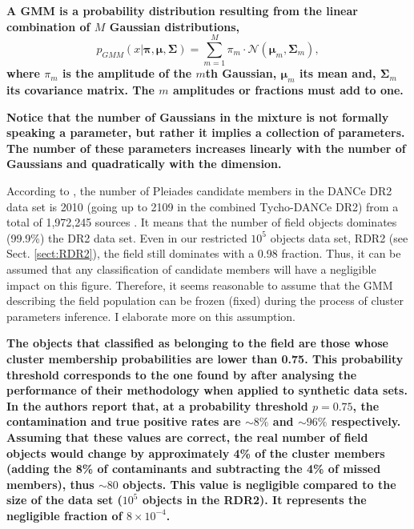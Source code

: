 \textbf{A GMM is a probability distribution resulting from the linear combination of $M$ Gaussian distributions, }
\begin{equation}
p_{GMM}(x|\boldsymbol{\pi},\boldsymbol{\mu},\boldsymbol{\Sigma})=\sum_{m=1}^M \pi_m \cdot \mathcal{N}(\boldsymbol{\mu}_m,\boldsymbol{\Sigma}_m),
\end{equation}
\textbf{where $\pi_m$ is the amplitude of the $m$th Gaussian, $\boldsymbol{\mu}_m$ its mean and, $\boldsymbol{\Sigma}_m$ its covariance matrix. The $m$ amplitudes or fractions must add to one. }

\textbf{Notice that the number of Gaussians in the mixture is not formally speaking a parameter, but rather it implies a collection of parameters. The number of these parameters increases linearly with the number of Gaussians and quadratically with the dimension.} 

According to \citet{Bouy2015}, the number of Pleiades candidate members in the DANCe DR2 data set is 2010 (going up to 2109 in the combined Tycho-DANCe DR2) from a total of 1,972,245 sources . It means that the number of field objects dominates (99.9\%) the DR2 data set. Even in our restricted $10^5$ objects data set, RDR2 (see Sect. \ref{sect:RDR2}), the field still dominates with a 0.98 fraction. Thus, it can be assumed that any classification of candidate members will have a negligible impact on this figure. Therefore, it seems reasonable to assume that the GMM describing the field population can be frozen (fixed) during the process of cluster parameters inference. I elaborate more on this assumption.


\textbf{The objects that \citet{Bouy2015} classified as belonging to the field are those whose cluster membership probabilities are lower than 0.75. This probability threshold corresponds to the one found by \citet{Sarro2014} after analysing the performance of their methodology when applied to synthetic data sets. In \citet{Sarro2014} the authors report that, at a probability threshold $p=0.75$, the contamination and true positive rates are $\sim 8\%$ and $ \sim96\%$ respectively. Assuming that these values are correct, the real number of field objects would change by approximately 4\% of the cluster members (adding the 8\% of contaminants and subtracting the 4\% of missed members), thus $\sim 80$ objects. This value is negligible compared to the size of the data set ($10^5$ objects in the RDR2). It represents the negligible fraction of $ 8\times10^{-4}$. }

